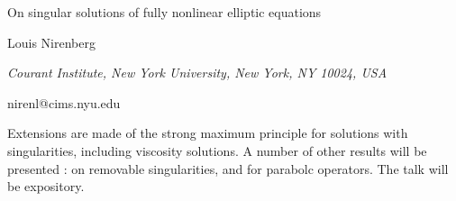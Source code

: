 \documentclass[10pt,a4paper]{article}
\begin{document}
\begin{center}

{\Large On singular solutions of fully nonlinear elliptic equations}

\bigskip

{\sc Louis Nirenberg}

{\small\it Courant Institute, New York University, New York, NY 10024, USA}

{\small\rm nirenl@cims.nyu.edu}

\end{center}

\bigskip

Extensions are made of the strong maximum principle for
solutions with singularities,
including viscosity solutions.
A number of
other results will be presented :
on removable singularities, and for
parabolc operators.
The talk will be expository.
\end{document}
